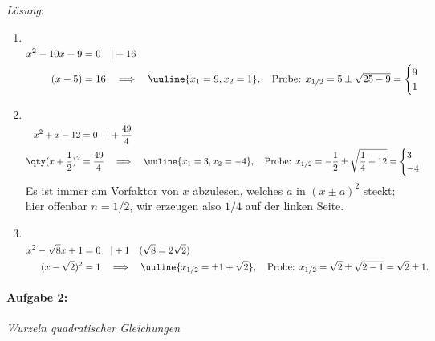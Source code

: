 \emph{Lösung}:
\begin{enumerate}[label=(\alph*)]
    \item$~$\\[-1.4cm]
    \begin{align}
        x^2 -10x+ 9 &= 0 \quad |+16 \\
        (x-5) &= 16 \quad \Longrightarrow \quad \uuline{x_1 = 9, x_2 = 1},\quad\text{Probe: } x_{1/2} = 5 \pm \sqrt{25-9} = \begin{cases}
            9 \\ 1
        \end{cases}
    \end{align}
    \item$~$\\[-1.4cm]
    \begin{align}
        x^2 + x - 12 &=0 \quad | + \frac{49}{4} \\
        \qty(x+\frac{1}{2})^2 &= \frac{49}{4} \quad \Longrightarrow \quad \uuline{x_1 = 3, x_2 = -4},\quad\text{Probe: } x_{1/2} = -\frac{1}{2}\pm \sqrt{\frac{1}{4}+12} = \begin{cases}
            3 \\ -4
        \end{cases}
    \end{align}
    Es ist immer am Vorfaktor von $x$ abzulesen, welches $a$ in $(x\pm a)^2$ steckt; hier offenbar $n = 1/2$, wir erzeugen also $1/4$ auf der linken Seite.
    \item$~$\\[-1.4cm] 
    \begin{align}
        x^2-\sqrt{8}x+1 &=0 \quad |+1 \quad (\sqrt{8} = 2\sqrt{2}) \\
        (x-\sqrt{2})^2 &= 1 \quad \Longrightarrow \quad \uuline{x_{1/2} = \pm 1 + \sqrt{2}},\quad\text{Probe: } x_{1/2} = \sqrt{2} \pm \sqrt{2-1} = \sqrt{2}\pm 1.
    \end{align}
\end{enumerate}

\paragraph{Aufgabe 2: } \emph{Wurzeln quadratischer Gleichungen}

